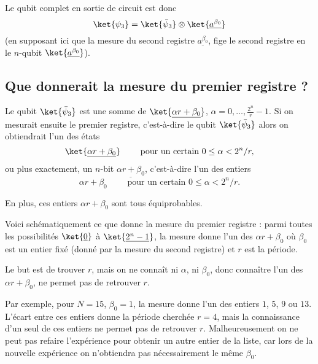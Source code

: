 \documentclass[11pt,class=report,crop=false]{standalone}
\begin{document}
Le qubit complet en sortie de circuit est donc 
$$\ket{\psi_3} = \ket{\bar \psi_3} \otimes \ket{ \underline{a^{\beta_0}} }$$
(en supposant ici que la mesure du second registre $\underline{a^{\beta_0}}$, fige le second registre en le $n$-qubit $\ket{ \underline{a^{\beta_0}} }$).

 
\subsection{Que donnerait la mesure du premier registre ?}


Le qubit $\ket{\bar \psi_3}$ est une somme de $\ket{\underline{\alpha r + \beta_0}}$, $\alpha=0,\ldots, \frac{2^n}{r}-1$.
Si on mesurait ensuite le premier registre, c'est-à-dire le qubit $\ket{\bar \psi_3}$ alors on obtiendrait l'un des états 
$$\ket{\underline{\alpha r + \beta_0}} \qquad \text{ pour un certain } 0 \le \alpha < 2^n/r,$$
ou plus exactement, un $n$-bit $\underline{\alpha r + \beta_0}$, c'est-à-dire l'un des entiers 
$$\alpha r + \beta_0 \qquad \text{ pour un certain } 0 \le \alpha < 2^n/r.$$

En plus, ces entiers $\alpha r + \beta_0$ sont tous équiprobables.

Voici schématiquement ce que donne la mesure du premier registre : parmi toutes les possibilités $\ket{\underline{0}}$ à $\ket{\underline{2^n-1}}$, la mesure donne l'un des 
$\alpha r + \beta_0$ où $\beta_0$ est un entier fixé (donné par la mesure du second registre) et $r$ est la période.


Le but est de trouver $r$, mais on ne connaît ni $\alpha$, ni $\beta_0$, donc connaître 
l'un des $\alpha r + \beta_0$, ne permet pas de retrouver $r$.

Par exemple, pour $N=15$, $\beta_0=1$, la mesure donne l'un des entiers $1$, $5$, $9$ ou $13$. 
L'écart entre ces entiers donne la période cherchée $r=4$, mais la connaissance d'un seul de ces entiers ne permet pas de retrouver $r$. 
Malheureusement on ne peut pas refaire l'expérience pour obtenir un autre entier de la liste, car lors de la nouvelle expérience on n'obtiendra pas nécessairement le même $\beta_0$.

\end{document}
